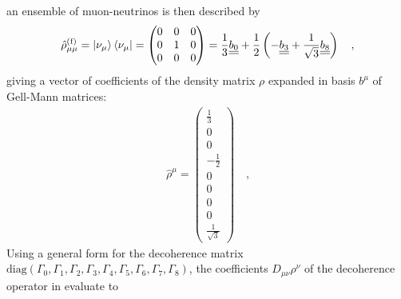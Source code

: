 \iffalse
an ensemble of muon-neutrinos is then described by
%
\begin{align} \label{eq:rho_numu}
    \hat{\rho}^\text{(f)}_{\mu\mu} = \ket{\nu_\mu}\bra{\nu_\mu} 
    = 
    \begin{pmatrix} 0 & 0 & 0 \\ 0 & 1 & 0 \\ 0 & 0 & 0 \end{pmatrix}
    =
    \frac{1}{3}\underline{\underline{b_0}} + \frac{1}{2} \left( - \underline{\underline{b_3}} + \frac{1}{\sqrt{3}} \underline{\underline{b_8}} \right)
    \quad \text{,}
\end{align}
%
giving a vector of coefficients of the density matrix $\rho$ expanded in basis $b^\mu$ of Gell-Mann matrices:
%
\begin{align} \label{eq:rho_coefficients}
    \hat{\rho}^{\mu}
    = 
    \begin{pmatrix}
    \frac{1}{3} \\ 0 \\ 0 \\ - \frac{1}{2} \\ 0 \\ 0 \\ 0 \\ 0 \\ \frac{1}{\sqrt{3}}    
    \end{pmatrix}
    \quad \text{,}
\end{align}
%
Using a general form for the decoherence matrix $\text{diag}(\Gamma_0,\Gamma_1,\Gamma_2,\Gamma_3,\Gamma_4,\Gamma_5,\Gamma_6,\Gamma_7,\Gamma_8)$, the coefficients $D_{\mu\nu}\rho^\nu$ of the decoherence operator in  evaluate to
%
